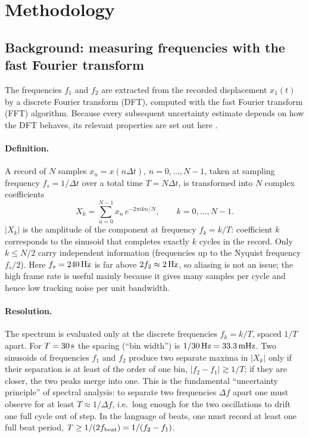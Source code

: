 \section{Methodology}\label{sec:method}

\subsection{Background: measuring frequencies with the fast Fourier transform}\label{sec:fftbackground}

The frequencies $f_1$ and $f_2$ are extracted from the recorded displacement $x_1(t)$ by a discrete Fourier transform (DFT), computed with the fast Fourier transform (FFT) algorithm. Because every subsequent uncertainty estimate depends on how the DFT behaves, its relevant properties are set out here \cite{lyons,harris}.

\paragraph{Definition.} A record of $N$ samples $x_n=x(n\Delta t)$, $n=0,\dots,N-1$, taken at sampling frequency $f_s=1/\Delta t$ over a total time $T=N\Delta t$, is transformed into $N$ complex coefficients
\begin{equation}
X_k=\sum_{n=0}^{N-1}x_n\,e^{-2\pi i kn/N},\qquad k=0,\dots,N-1 .
\label{eq:dft}
\end{equation}
$|X_k|$ is the amplitude of the component at frequency $f_k=k/T$: coefficient $k$ corresponds to the sinusoid that completes exactly $k$ cycles in the record. Only $k\leq N/2$ carry independent information (frequencies up to the Nyquist frequency $f_s/2$). Here $f_s=240\,\mathrm{Hz}$ is far above $2f_2\approx2\,\mathrm{Hz}$, so aliasing is not an issue; the high frame rate is useful mainly because it gives many samples per cycle and hence low tracking noise per unit bandwidth.

\paragraph{Resolution.} The spectrum is evaluated only at the discrete frequencies $f_k=k/T$, spaced $1/T$ apart. For $T=30\,\mathrm{s}$ the spacing (``bin width'') is $1/30\,\mathrm{Hz}=33.3\,\mathrm{mHz}$. Two sinusoids of frequencies $f_1$ and $f_2$ produce two separate maxima in $|X_k|$ only if their separation is at least of the order of one bin, $|f_2-f_1|\gtrsim1/T$; if they are closer, the two peaks merge into one. This is the fundamental ``uncertainty principle'' of spectral analysis: to separate two frequencies $\Delta f$ apart one must observe for at least $T\approx1/\Delta f$, i.e.\ long enough for the two oscillations to drift one full cycle out of step. In the language of beats, one must record at least one full beat period, $T\geq 1/(2 f_{\rm beat})=1/(f_2-f_1)$.

